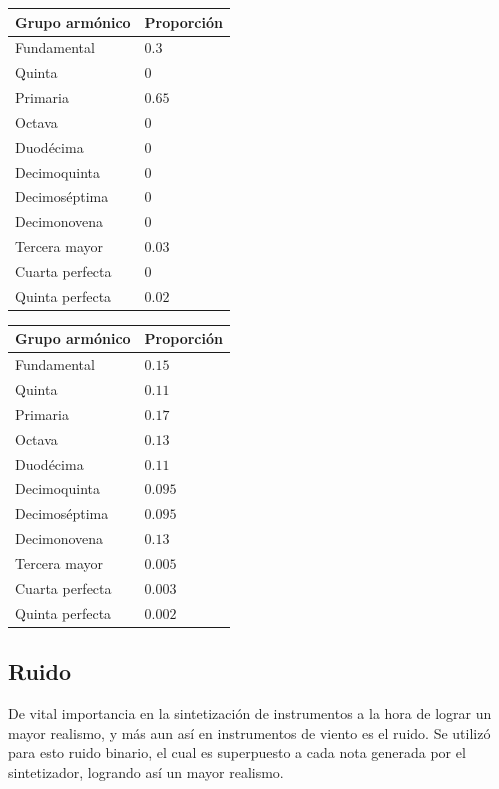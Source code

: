 \begin{multicols}{2}
\begin{table}[H]
\centering
\begin{tabular}{@{}ll@{}}
\toprule
\textbf{Grupo armónico} & \textbf{Proporción} \\ \midrule
Fundamental & $0.3$ \\ 
Quinta & $0$ \\ 
 Primaria& $0.65$ \\ 
 Octava& $0$ \\ 
 Duodécima& $0$ \\ 
 Decimoquinta& $0$ \\ 
 Decimoséptima& $0$ \\ 
 Decimonovena& $0$ \\ 
 Tercera mayor& $0.03$ \\ 
 Cuarta perfecta& $0$ \\ 
 Quinta perfecta& $0.02$ \\ \bottomrule
\end{tabular}
\end{table}
\begin{table}[H]
\centering
\begin{tabular}{@{}ll@{}}
\toprule
\textbf{Grupo armónico} & \textbf{Proporción} \\ \midrule
Fundamental & $0.15$ \\ 
Quinta & $0.11$ \\ 
 Primaria& $0.17$ \\ 
 Octava& $0.13$ \\ 
 Duodécima& $0.11$ \\ 
 Decimoquinta& $0.095$ \\ 
 Decimoséptima& $0.095$ \\ 
 Decimonovena& $0.13$ \\ 
 Tercera mayor& $0.005$ \\ 
 Cuarta perfecta& $0.003$ \\ 
 Quinta perfecta& $0.002$ \\ \bottomrule
\end{tabular}
\end{table}
\end{multicols}

\subsection{Ruido}

De vital importancia en la sintetización de instrumentos a la hora de lograr un mayor realismo, y más aun así en instrumentos de viento es el ruido. Se utilizó para esto ruido binario, el cual es superpuesto a cada nota generada por el sintetizador, logrando así un mayor realismo.

